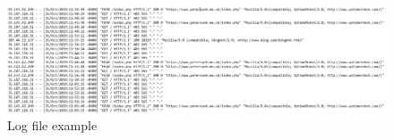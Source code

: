 \begin{figure}[H] \label{Log file example}
    \centering
    \includegraphics[width=170mm]{Apdenix/DodgyIPs.PNG}
    \caption{Log file example}
    \label{fig:my_label}
\end{figure}